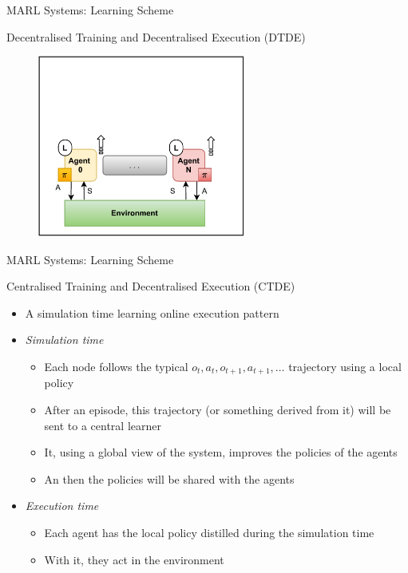 \documentclass[presentation, 8pt]{beamer}\mode<presentation>{\usetheme{AMSBolognaFC}}
\begin{document}
	
	\begin{frame}{MARL Systems: Learning Scheme}
		\begin{exampleblock}{Decentralised Training and Decentralised Execution (DTDE)}
			\begin{figure}
				\includegraphics[height=6cm]{img/learning-scheme-dtde.pdf}
			\end{figure}
		\end{exampleblock}
	\end{frame}
	
	\begin{frame}{MARL Systems: Learning Scheme}
		
		\begin{exampleblock}{Centralised Training and Decentralised Execution (CTDE)}
			\begin{itemize}
				\item A simulation time learning online execution pattern
				\item \emph{Simulation time}
				\begin{itemize}
					\item Each node follows the typical $o_t, a_t, o_{t+1}, a_{t+1},\dots $ trajectory using a local policy
					\item After an episode, this trajectory (or something derived from it) will be sent to a central learner
					\item It, using a global view of the system, improves the policies of the agents 
					\item An then the policies will be shared with the agents
				\end{itemize} 
				\item \emph{Execution time}
					\begin{itemize}
						\item Each agent has the local policy distilled during the simulation time
						\item With it, they act in the environment
					\end{itemize}
			\end{itemize}
		\end{exampleblock}
	\end{frame}
	
\end{document}
